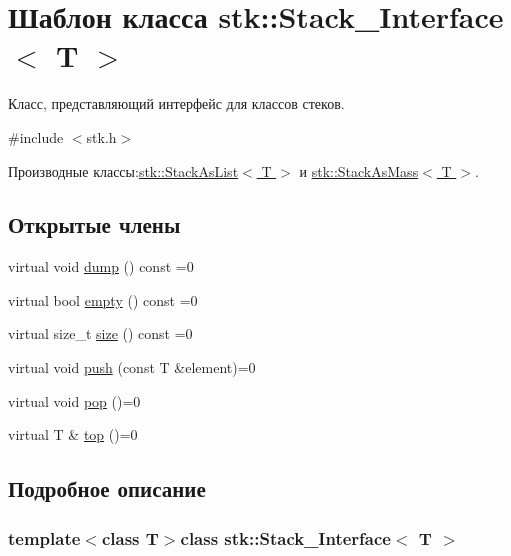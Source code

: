 \hypertarget{classstk_1_1_stack___interface}{}\section{Шаблон класса stk\+:\+:Stack\+\_\+\+Interface$<$ T $>$}
\label{classstk_1_1_stack___interface}


Класс, представляющий интерфейс для классов стеков.  




{\ttfamily \#include $<$stk.\+h$>$}



Производные классы\+:\hyperlink{classstk_1_1_stack_as_list}{stk\+::\+Stack\+As\+List$<$ T $>$} и \hyperlink{classstk_1_1_stack_as_mass}{stk\+::\+Stack\+As\+Mass$<$ T $>$}.

\subsection*{Открытые члены}
\begin{DoxyCompactItemize}
\item 
virtual void \hyperlink{classstk_1_1_stack___interface_af00db15e47ba67823e4c8a48b02696cf}{dump} () const =0
\item 
virtual bool \hyperlink{classstk_1_1_stack___interface_a110be2e10971d665a46febee3606d353}{empty} () const =0
\item 
virtual size\+\_\+t \hyperlink{classstk_1_1_stack___interface_a3a0b1b8863b419f37662252285954258}{size} () const =0
\item 
virtual void \hyperlink{classstk_1_1_stack___interface_a530e980f187732215e15b51e9b895ffc}{push} (const T \&element)=0
\item 
virtual void \hyperlink{classstk_1_1_stack___interface_a1b575af9649d9ce6285183469a466f9f}{pop} ()=0
\item 
virtual T \& \hyperlink{classstk_1_1_stack___interface_a72962a23863f45a8b2b6905144689681}{top} ()=0
\end{DoxyCompactItemize}


\subsection{Подробное описание}
\subsubsection*{template$<$class T$>$class stk\+::\+Stack\+\_\+\+Interface$<$ T $>$}

